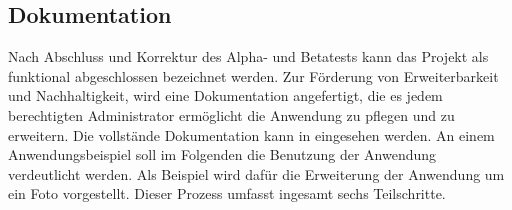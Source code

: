 \subsection{Dokumentation}
\label{sec:Dokumentation}

Nach Abschluss und Korrektur des Alpha- und Betatests kann das Projekt als
funktional abgeschlossen bezeichnet werden. Zur Förderung von Erweiterbarkeit
und Nachhaltigkeit, wird eine Dokumentation angefertigt, die es jedem
berechtigten Administrator ermöglicht die Anwendung zu pflegen und zu erweitern.
Die vollstände Dokumentation kann in \citet{dokumentation2014} eingesehen
werden. An einem Anwendungsbeispiel soll im Folgenden die Benutzung der
Anwendung verdeutlicht werden. Als Beispiel wird dafür die Erweiterung der
Anwendung um ein Foto vorgestellt. Dieser Prozess umfasst ingesamt sechs
Teilschritte.


